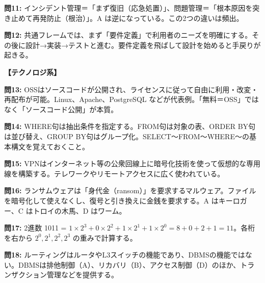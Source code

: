 \begin{kaisetsu}
\textbf{問11:} インシデント管理＝「まず復旧（応急処置）」、問題管理＝「根本原因を突き止めて再発防止（根治）」。A は逆になっている。この2つの違いは頻出。
\end{kaisetsu}

\begin{kaisetsu}
\textbf{問12:} 共通フレームでは、まず「要件定義」で利用者のニーズを明確にする。その後に設計→実装→テストと進む。要件定義を飛ばして設計を始めると手戻りが起きる。
\end{kaisetsu}

\vspace{0.5em}
\noindent\textbf{【テクノロジ系】}

\begin{kaisetsu}
\textbf{問13:} OSSはソースコードが公開され、ライセンスに従って自由に利用・改変・再配布が可能。Linux、Apache、PostgreSQL などが代表例。「無料＝OSS」ではなく「ソースコード公開」が本質。
\end{kaisetsu}

\begin{kaisetsu}
\textbf{問14:} WHERE句は抽出条件を指定する。FROM句は対象の表、ORDER BY句は並び替え、GROUP BY句はグループ化。SELECT〜FROM〜WHERE〜の基本構文を覚えておくこと。
\end{kaisetsu}

\begin{kaisetsu}
\textbf{問15:} VPNはインターネット等の公衆回線上に暗号化技術を使って仮想的な専用線を構築する。テレワークやリモートアクセスに広く使われている。
\end{kaisetsu}

\begin{kaisetsu}
\textbf{問16:} ランサムウェアは「身代金（ransom）」を要求するマルウェア。ファイルを暗号化して使えなくし、復号と引き換えに金銭を要求する。A はキーロガー、C はトロイの木馬、D はワーム。
\end{kaisetsu}

\begin{kaisetsu}
\textbf{問17:} 2進数 1011 = $1 \times 2^3 + 0 \times 2^2 + 1 \times 2^1 + 1 \times 2^0 = 8 + 0 + 2 + 1 = 11$。各桁を右から $2^0, 2^1, 2^2, 2^3$ の重みで計算する。
\end{kaisetsu}

\begin{kaisetsu}
\textbf{問18:} ルーティングはルータやL3スイッチの機能であり、DBMSの機能ではない。DBMSは排他制御（A）、リカバリ（B）、アクセス制御（D）のほか、トランザクション管理などを提供する。
\end{kaisetsu}


